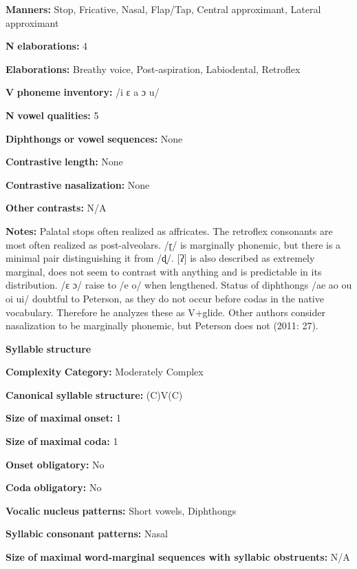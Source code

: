 \textbf{Manners:} Stop, Fricative, Nasal, Flap/Tap, Central approximant, Lateral approximant

\textbf{N} \textbf{elaborations:} 4

\textbf{Elaborations:} Breathy voice, Post-aspiration, Labiodental, Retroflex

\textbf{V} \textbf{phoneme} \textbf{inventory:} /i ɛ a ɔ u/

\textbf{N} \textbf{vowel} \textbf{qualities:} 5

\textbf{Diphthongs} \textbf{or} \textbf{vowel} \textbf{sequences:} None

\textbf{Contrastive} \textbf{length:} None

\textbf{Contrastive} \textbf{nasalization:} None

\textbf{Other} \textbf{contrasts:} N/A

\textbf{Notes:} Palatal stops often realized as affricates. The retroflex consonants are most often realized as post-alveolars. /ɽ/ is marginally phonemic, but there is a minimal pair distinguishing it from /ɖ/. [ʔ] is also described as extremely marginal, does not seem to contrast with anything and is predictable in its distribution. /ɛ ɔ/ raise to /e o/ when lengthened. Status of diphthongs /ae ao ou oi ui/ doubtful to Peterson, as they do not occur before codas in the native vocabulary. Therefore he analyzes these as V+glide. Other authors consider nasalization to be marginally phonemic, but Peterson does not (2011: 27).

\textbf{Syllable} \textbf{structure}

\textbf{Complexity} \textbf{Category:} Moderately Complex

\textbf{Canonical} \textbf{syllable} \textbf{structure:} (C)V(C) \citep[32-3]{Peterson2011}

\textbf{Size} \textbf{of} \textbf{maximal} \textbf{onset:} 1

\textbf{Size} \textbf{of} \textbf{maximal} \textbf{coda:} 1

\textbf{Onset} \textbf{obligatory:} No

\textbf{Coda} \textbf{obligatory:} No

\textbf{Vocalic} \textbf{nucleus} \textbf{patterns:} Short vowels, Diphthongs

\textbf{Syllabic} \textbf{consonant} \textbf{patterns:} Nasal

\textbf{Size} \textbf{of} \textbf{maximal} \textbf{word{}-marginal sequences with syllabic obstruents:} N/A

